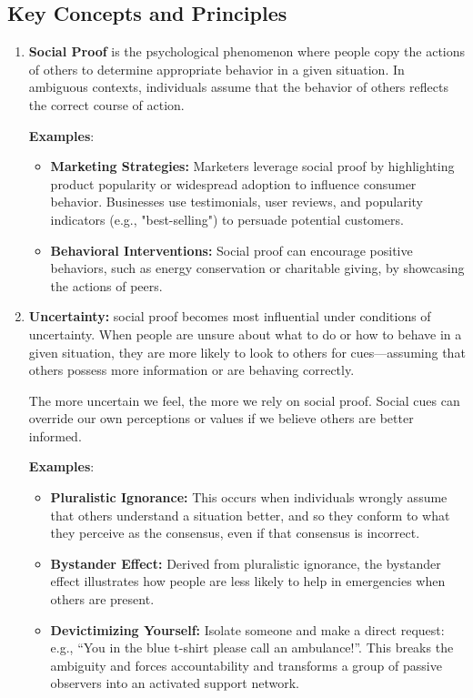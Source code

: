 \subsection*{Key Concepts and Principles}
\begin{enumerate}
    \item \textbf{Social Proof} is the psychological phenomenon where people copy the actions of others to determine appropriate behavior in a given situation. In ambiguous contexts, individuals assume that the behavior of others reflects the correct course of action.
    
    \textbf{Examples}:
    \begin{itemize}
        \item \textbf{Marketing Strategies:} Marketers leverage social proof by highlighting product popularity or widespread adoption to influence consumer behavior. Businesses use testimonials, user reviews, and popularity indicators (e.g., "best-selling") to persuade potential customers.
        \item \textbf{Behavioral Interventions:} Social proof can encourage positive behaviors, such as energy conservation or charitable giving, by showcasing the actions of peers.
    \end{itemize}

    \item \textbf{Uncertainty:} social proof becomes most influential under conditions of uncertainty. When people are unsure about what to do or how to behave in a given situation, they are more likely to look to others for cues—assuming that others possess more information or are behaving correctly.
    
    The more uncertain we feel, the more we rely on social proof. Social cues can override our own perceptions or values if we believe others are better informed.
    
    \textbf{Examples}:
    \begin{itemize}
        \item \textbf{Pluralistic Ignorance:} This occurs when individuals wrongly assume that others understand a situation better, and so they conform to what they perceive as the consensus, even if that consensus is incorrect.
        \item \textbf{Bystander Effect:} Derived from pluralistic ignorance, the bystander effect illustrates how people are less likely to help in emergencies when others are present.
        \item \textbf{Devictimizing Yourself:} Isolate someone and make a direct request: e.g., “You in the blue t-shirt please call an ambulance!”. This breaks the ambiguity and forces accountability and  transforms a group of passive observers into an activated support network.
    \end{itemize}


\end{enumerate}
